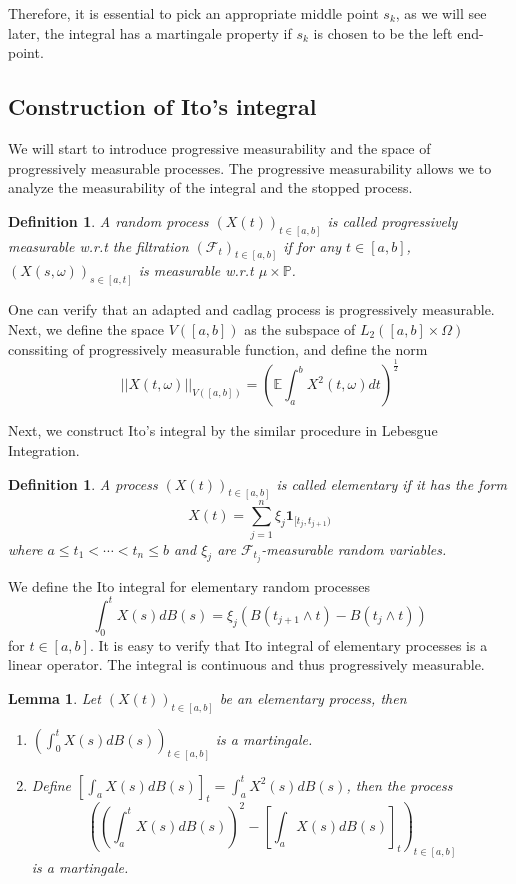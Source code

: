 \documentclass[11pt,english]{smfart}
\newtheorem{definition}[theorem]{Definition}
\newtheorem{lemma}[theorem]{Lemma}
\newcommand{\mb}{\mathbb}
\newcommand{\mc}{\mathcal}
\newcommand{\mf}{\mathbf}
\begin{document}
Therefore, it is essential to pick an appropriate middle point $s_k$, as we will see later, the integral has a martingale property if $s_k
$ is chosen to be the left end-point. 

\subsection{Construction of Ito's integral}

We will start to introduce progressive measurability and the space of progressively measurable processes. The progressive measurability allows we to analyze the measurability of the integral and the stopped process. \\

\begin{definition}
    A random process $(X(t))_{t\in [a,b]}$ is called progressively measurable w.r.t the filtration $(\mc{F}_t)_{t\in [ a,b]}$ if for any $t\in [a,b]$, $(X(s,\omega))_{s\in [a,t]}$ is measurable w.r.t $\mu \times \mb{P}$.
\end{definition}

One can verify that an adapted and cadlag process is progressively measurable. Next, we define the space $V([a,b])$ as the subspace of $L_2([a,b]\times \Omega)$ conssiting of progressively measurable function, and define the norm $$||X(t,\omega)||_{V([a,b])} = \left(\mb{E}\int_a^b X^2(t,\omega) dt\right)^{\frac{1}{2}}$$

Next, we construct Ito's integral by the similar procedure in Lebesgue Integration. \\

\begin{definition}
    A process $(X(t))_{t\in [a,b]}$ is called elementary if it has the form $$X(t) = \sum_{j=1}^n \xi_j \mf{1}_{[t_j,t_{j+1})}$$
    where $a\leq t_1 < \cdots< t_n \leq b$ and $\xi_j $ are $\mc{F}_{t_j}$-measurable random variables.
\end{definition}

We define the Ito integral for elementary random processes $$\int_0^t X(s)dB(s) =  \xi_j (B(t_{j+1}\wedge t) - B(t_j \wedge  t))$$
for $t \in [a,b]$. It is easy to verify that Ito integral of elementary processes is a linear operator. The integral is continuous and thus progressively measurable.\\

\begin{lemma}
    Let $(X(t))_{t\in [a,b]}$ be an elementary process, then 
    \begin{enumerate}[(1)]
        \item $\left( \int_0^t X(s) dB(s)\right)_{t\in [a,b]}$ is a martingale. 
        \item Define $\left[\int_a X(s) dB(s) \right]_t = \int_a^t X^2(s) dB(s)$, then the process $$\left(\left(\int_a^t X(s)dB(s)\right)^2 - \left[\int_a X(s)dB(s)\right]_t\right)_{t\in [a,b]}$$ is a martingale.
    \end{enumerate}
\end{lemma}
\end{document}
